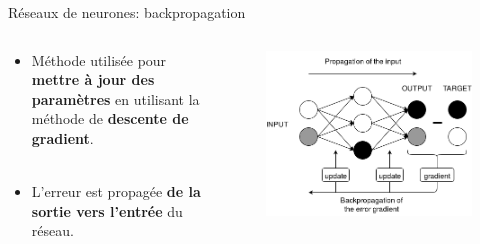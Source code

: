 \documentclass[hyperref={pdfpagelabels=false}]{beamer}
\begin{document}
    \begin{frame}{Réseaux de neurones: backpropagation}
        \begin{columns}
            \begin{column}{0.4\textwidth}
                \begin{itemize}
                    \item Méthode utilisée pour \textbf{mettre à jour des 
                        paramètres} en utilisant la méthode de \textbf{descente 
                        de gradient}.\\~\\
                    \item L'erreur est propagée \textbf{de la sortie vers l'entrée} du 
                        réseau.
                \end{itemize}
            \end{column}
            \begin{column}{0.6\textwidth}
                \begin{figure}[h]
                    \centering
                    \includegraphics[scale=.20]{backprop}
                \end{figure}
            \end{column}
        \end{columns}
    \end{frame}
\end{document}
